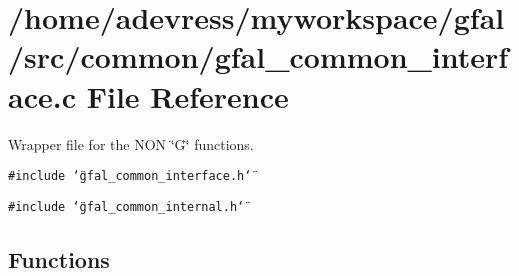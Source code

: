\section{/home/adevress/myworkspace/gfal/src/common/gfal\_\-common\_\-interface.c File Reference}
\label{gfal__common__interface_8c}
Wrapper file for the NON \char`\"{}G\char`\"{} functions. 

{\tt \#include \char`\"{}gfal\_\-common\_\-interface.h\char`\"{}}\par
{\tt \#include \char`\"{}gfal\_\-common\_\-internal.h\char`\"{}}\par
\subsection*{Functions}
